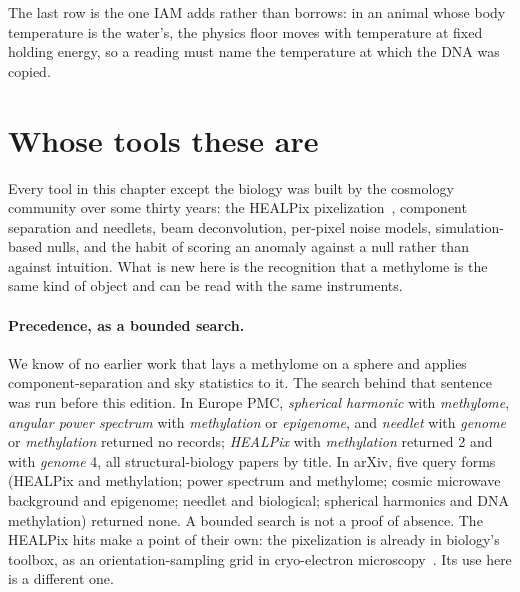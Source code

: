 The last row is the one IAM adds rather than borrows: in an animal whose body temperature is the water's, the physics floor moves with
temperature at fixed holding energy, so a reading must name the temperature at which the DNA was copied.

\section{Whose tools these are}\label{sec:p4whosetools}

Every tool in this chapter except the biology was built by the cosmology community over some thirty years: the HEALPix
pixelization~\cite{Gorski2005}, component separation and needlets, beam deconvolution, per-pixel noise models, simulation-based nulls,
and the habit of scoring an anomaly against a null rather than against intuition. What is new here is the recognition that a
methylome is the same kind of object and can be read with the same instruments.

\paragraph{Precedence, as a bounded search.} We know of no earlier work that lays a methylome on a sphere and applies component-separation
and sky statistics to it. The search behind that sentence was run before this edition. In Europe PMC, \emph{spherical harmonic} with \emph{methylome},
\emph{angular power spectrum} with \emph{methylation} or \emph{epigenome}, and \emph{needlet} with \emph{genome} or \emph{methylation}
returned no records; \emph{HEALPix} with \emph{methylation} returned 2 and with \emph{genome} 4, all structural-biology papers by title.
In arXiv, five query forms (HEALPix and methylation; power spectrum and methylome; cosmic microwave background and epigenome; needlet and
biological; spherical harmonics and DNA methylation) returned none. \observed{} A bounded search is not a proof of absence. The HEALPix
hits make a point of their own: the pixelization is already in biology's toolbox, as an orientation-sampling grid in cryo-electron
microscopy~\cite{Scheres2012}. Its use here is a different one.
